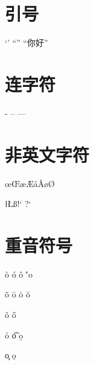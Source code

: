 \documentclass{article}
\begin{document}

    \METAFONT{}

    \MF{}

    \MP{}

    \section{引号}
    `' ``'' ``你好''

    \section{连字符}
    - -- ---

    \section{非英文字符}
    \oe  \OE  \ae  \AE  \aa  \AA  \o  \O 

    \l \L \ss \SS !` ?`
    
    \section{重音符号}
    \`o \'o \^o \''o 
    
    \~o \=o \.o \u{o}
    
    \v{o} \H{o}
    
    \r{o} \t{o} \b{o}

    \c{o} \d{o}
\end{document}
